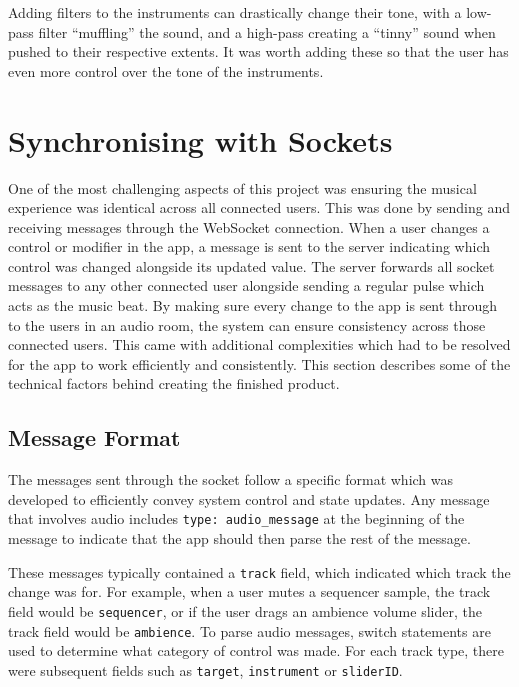 Adding filters to the instruments can drastically change their tone, with a low-pass filter “muffling” the sound, and a high-pass creating a “tinny” sound when pushed to their respective extents. It was worth adding these so that the user has even more control over the tone of the instruments.

\section{Synchronising with Sockets}
One of the most challenging aspects of this project was ensuring the musical experience was identical across all connected users. This was done by sending and receiving messages through the WebSocket connection. When a user changes a control or modifier in the app, a message is sent to the server indicating which control was changed alongside its updated value. The server forwards all socket messages to any other connected user alongside sending a regular pulse which acts as the music beat.
By making sure every change to the app is sent through to the users in an audio room, the system can ensure consistency across those connected users. This came with additional complexities which had to be resolved for the app to work efficiently and consistently. This section describes some of the technical factors behind creating the finished product.

\subsection{Message Format}
The messages sent through the socket follow a specific format which was developed to efficiently convey system control and state updates. Any message that involves audio includes \verb|type: audio_message| at the beginning of the message to indicate that the app should then parse the rest of the message.

These messages typically contained a \verb|track| field, which indicated which track the change was for. For example, when a user mutes a sequencer sample, the track field would be \verb|sequencer|, or if the user drags an ambience volume slider, the track field would be \verb|ambience|. To parse audio messages, switch statements are used to determine what category of control was made. For each track type, there were subsequent fields such as \verb|target|, \verb|instrument| or \verb|sliderID|.

